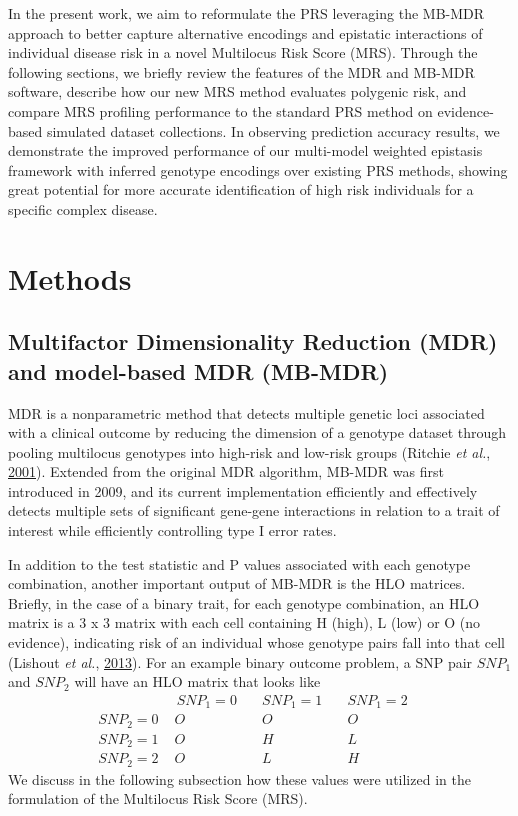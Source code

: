 \documentclass{ws-procs11x85}
\begin{document}
In the present work, we aim to reformulate the PRS leveraging the MB-MDR
approach to better capture alternative encodings and epistatic
interactions of individual disease risk in a novel Multilocus Risk Score
(MRS). Through the following sections, we briefly review the features of
the MDR and MB-MDR software, describe how our new MRS method evaluates
polygenic risk, and compare MRS profiling performance to the standard
PRS method on evidence-based simulated dataset collections. In observing
prediction accuracy results, we demonstrate the improved performance of
our multi-model weighted epistasis framework with inferred genotype
encodings over existing PRS methods, showing great potential for more
accurate identification of high risk individuals for a specific complex
disease.

\section{Methods}
\subsection{Multifactor Dimensionality Reduction (MDR) and
model-based MDR
(MB-MDR)}\label{multifactor-dimensionality-reduction-mdr-and-model-based-mdr-mb-mdr}
MDR is a nonparametric method that detects multiple genetic loci
associated with a clinical outcome by reducing the dimension of a
genotype dataset through pooling multilocus genotypes into high-risk and
low-risk groups (Ritchie \emph{et al.},
\protect\hyperlink{ref-E26QhGxD}{2001}). Extended from the original MDR
algorithm, MB-MDR was first introduced in 2009, and its current
implementation efficiently and effectively detects multiple sets of
significant gene-gene interactions in relation to a trait of interest
while efficiently controlling type I error rates.

In addition to the test statistic and P values associated with each
genotype combination, another important output of MB-MDR is the HLO
matrices. Briefly, in the case of a binary trait, for each genotype
combination, an HLO matrix is a 3 x 3 matrix with each cell containing H
(high), L (low) or O (no evidence), indicating risk of an individual
whose genotype pairs fall into that cell (Lishout \emph{et al.},
\protect\hyperlink{ref-S6nj6BFK}{2013}). For an example binary outcome
problem, a SNP pair \(SNP_1\) and \(SNP_2\) will have an HLO
matrix that looks like \[ \begin{array}{l|ccc}
& \, SNP_1 = 0 \quad& SNP_1 = 1 \quad& SNP_1 = 2  \quad \\
\hline
SNP_2 = 0 \,\,& O        & O        & O \\
SNP_2 = 1 \,\,& O        & H        & L \\
SNP_2 = 2 \,\,& O        & L        & H
\end{array}
\] We discuss in the following subsection how these values were utilized
in the formulation of the Multilocus Risk Score (MRS).
\end{document}

